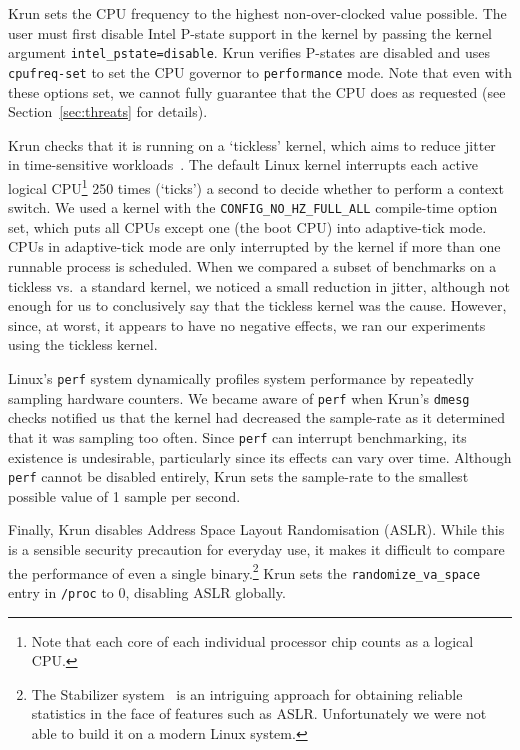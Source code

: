 \documentclass[a4paper,UKenglish]{lipics}
\newcommand{\krun}{Krun\xspace}
\begin{document}
\krun sets the CPU frequency to the highest non-over-clocked value possible.
The user must first disable Intel P-state support in
the kernel by passing the kernel argument \texttt{intel\_pstate=disable}.
\krun verifies P-states are disabled and uses \texttt{cpufreq-set} to set
the CPU governor to \texttt{performance} mode. Note that even with these
options set, we cannot fully guarantee that the CPU does as requested
(see Section~\ref{sec:threats} for details).

\krun checks that it is running on a `tickless' kernel, which aims to reduce
jitter in time-sensitive workloads~\cite{tickless}. The default
Linux kernel interrupts each active logical CPU\footnote{Note that each core of
each individual processor chip counts as a logical CPU.} 250 times (`ticks') a second to
decide whether to perform a context switch. We used a kernel with the
\texttt{CONFIG\_NO\_HZ\_FULL\_ALL} compile-time option set, which puts
all CPUs except one (the boot CPU) into adaptive-tick mode.
CPUs in adaptive-tick mode are only interrupted by the kernel if more than
one runnable process is scheduled.
When we compared a subset of benchmarks on a tickless vs.~a standard
kernel, we noticed a small reduction in jitter, although not enough for us to
conclusively say that the tickless kernel was the cause. However,
since, at worst, it appears to have no negative effects, we ran our experiments
using the tickless kernel.

Linux's \texttt{perf} system dynamically profiles system performance by
repeatedly sampling hardware counters. We became aware of \texttt{perf} when
\krun's \texttt{dmesg} checks notified us that the kernel had decreased the
sample-rate as it determined that it was sampling too often. Since \texttt{perf}
can interrupt benchmarking, its existence is undesirable, particularly since its
effects can vary over time. Although \texttt{perf} cannot be disabled entirely,
\krun sets the sample-rate to the smallest possible value of 1 sample per
second.

Finally, \krun disables Address Space Layout Randomisation (ASLR). While this is
a sensible security precaution for everyday use, it makes it difficult to
compare the performance of even a single binary.\footnote{The Stabilizer
system~\cite{curtsinger13stabilizer} is an intriguing approach for obtaining reliable
statistics in the face of features such as ASLR. Unfortunately we were not able
to build it on a modern Linux system.} \krun sets the
\texttt{randomize\_va\_space} entry in \texttt{/proc} to 0, disabling ASLR
globally.
\end{document}
